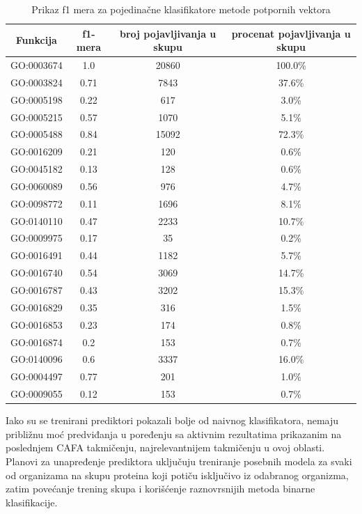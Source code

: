 \begin{table}[H]
	\centering
	\begin{tabular}{|c|c|c|c|}
		\hline
		Funkcija & f1-mera & broj pojavljivanja u skupu & procenat pojavljivanja u skupu \\
		\hline
		GO:0003674 & 1.0 & 20860 & 100.0\% \\
		\hline
		GO:0003824 & 0.71 & 7843 & 37.6\% \\
		\hline
		GO:0005198 & 0.22 & 617 & 3.0\% \\
		\hline
		GO:0005215 & 0.57 & 1070 & 5.1\% \\
		\hline
		GO:0005488 & 0.84 & 15092 & 72.3\% \\
		\hline
		GO:0016209 & 0.21 & 120 & 0.6\% \\
		\hline
		GO:0045182 & 0.13 & 128 & 0.6\% \\
		\hline
		GO:0060089 & 0.56 & 976 & 4.7\% \\
		\hline
		GO:0098772 & 0.11 & 1696 & 8.1\% \\
		\hline
		GO:0140110 & 0.47 & 2233 & 10.7\% \\
		\hline
		GO:0009975 & 0.17 & 35 & 0.2\% \\
		\hline
		GO:0016491 & 0.44 & 1182 & 5.7\% \\
		\hline
		GO:0016740 & 0.54 & 3069 & 14.7\% \\
		\hline
		GO:0016787 & 0.43 & 3202 & 15.3\% \\
		\hline
		GO:0016829 & 0.35 & 316 & 1.5\% \\
		\hline
		GO:0016853 & 0.23 & 174 & 0.8\% \\
		\hline
		GO:0016874 & 0.2 & 153 & 0.7\% \\
		\hline
		GO:0140096 & 0.6 & 3337 & 16.0\% \\
		\hline
		GO:0004497 & 0.77 & 201 & 1.0\% \\
		\hline
		GO:0009055 & 0.12 & 153 & 0.7\% \\
		\hline
	\end{tabular}
	\caption{Prikaz f1 mera za pojedina\v cne klasifikatore metode potpornih vektora}
	\label{tab: svmF1}
\end{table}


Iako su se trenirani prediktori pokazali bolje od naivnog klasifikatora, nemaju približnu moć predviđanja u poređenju sa aktivnim rezultatima prikazanim na poslednjem CAFA takmičenju, najrelevantnijem takmičenju u ovoj oblasti. Planovi za unapređenje prediktora uključuju treniranje posebnih modela za svaki od organizama na skupu proteina koji potiču isključivo iz odabranog organizma, zatim povećanje trening skupa i korišćenje raznovrsnijih  metoda binarne klasifikacije.

